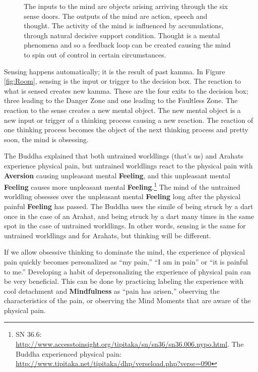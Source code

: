 \begin{figure}[H]
\centering

\caption{The inputs to the mind are objects arising arriving through the six sense doors. The outputs of the mind are action, speech and thought. The activity of the mind is influenced by accumulations, through natural decisive support condition. Thought is a mental phenomena and so a feedback loop can be created causing the mind to spin out of control in certain circumstances.}
\label{fig:Feedback}
\end{figure}

Sensing happens automatically; it is the result of past kamma. In Figure \ref{fig:Room}, sensing is the input or trigger to the decision box. The reaction to what is sensed creates new kamma. These are the four exits to the decision box; three leading to the Danger Zone and one leading to the Faultless Zone. The reaction to the sense creates a new mental object. The new mental object is a new input or trigger of a thinking process causing a new reaction. The reaction of one thinking process becomes the object of the next thinking process and pretty soon, the mind is obsessing.

The Buddha explained that both untrained worldlings (that’s us) and Arahats experience physical pain, but untrained worldlings react to the physical pain with \textbf{Aversion} causing unpleasant mental \textbf{Feeling}, and this unpleasant mental \textbf{Feeling} causes more unpleasant mental \textbf{Feeling}.\footnote{SN 36.6: \url{http://www.accesstoinsight.org/tipitaka/sn/sn36/sn36.006.nypo.html}. The Buddha experienced physical pain: \url{http://www.tipitaka.net/tipitaka/dhp/verseload.php?verse=090}} The mind of the untrained worldling obsesses over the unpleasant mental \textbf{Feeling} long after the physical painful \textbf{Feeling} has passed. The Buddha uses the simile of being struck by a dart once in the case of an Arahat, and being struck by a dart many times in the same spot in the case of untrained worldlings. In other words, sensing is the same for untrained worldlings and for Arahats, but thinking will be different.

\pagebreak

If we allow obsessive thinking to dominate the mind, the experience of physical pain quickly becomes personalized as “my pain,” “I am in pain” or “it is painful to me.” Developing a habit of depersonalizing the experience of physical pain can be very beneficial. This can be done by practicing labeling the experience with cool detachment and \textbf{Mindfulness} as “pain has arisen,” observing the characteristics of the pain, or observing the Mind Moments that are aware of the physical pain.

